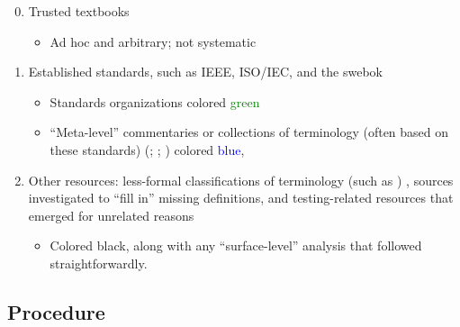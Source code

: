 \begin{enumerate}
      \setcounter{enumi}{-1}
      \item Trusted textbooks
            \citep{Patton2006, PetersAndPedrycz2000, vanVliet2000}
            \begin{itemize}
                  \item Ad hoc and arbitrary; not systematic
            \end{itemize}
      \item Established standards, such as IEEE, ISO/IEC, and the \acf{swebok}
            \begin{itemize}
                  \item Standards organizations \citep{IEEE2022, IEEE2017,
                              IEEE2013, ISO_IEC2023b, IEEE2012, ISO_IEC2023a,
                              IEEE2021, ISO_IEC2018, ISO2021, ISO2015}
                        colored \textcolor{green}{green}
                  \item ``Meta-level'' commentaries or collections of
                        terminology (often based on these standards)
                        \ifnotpaper
                              (\citealp{SWEBOK2024, SWEBOK2014};
                              \citealpISTQB{}; \citealp{Firesmith2015})
                        \else
                              \cite{SWEBOK2024, SWEBOK2014, ISTQB, Firesmith2015}
                        \fi colored \textcolor{blue}{blue},
            \end{itemize}
      \item Other resources: less-formal classifications of terminology
            \ifnotpaper
                  \citep[e.g.,][]{KuļešovsEtAl2013}%
            \else
                  (such as \citep{KuļešovsEtAl2013})%
            \fi%
            , sources investigated to
            ``fill in'' missing definitions,
            and testing-related resources that emerged for unrelated reasons
            \begin{itemize}
                  \item Colored black, along with any ``surface-level''
                        analysis that followed straightforwardly.
            \end{itemize}
\end{enumerate}

\subsection{Procedure}

